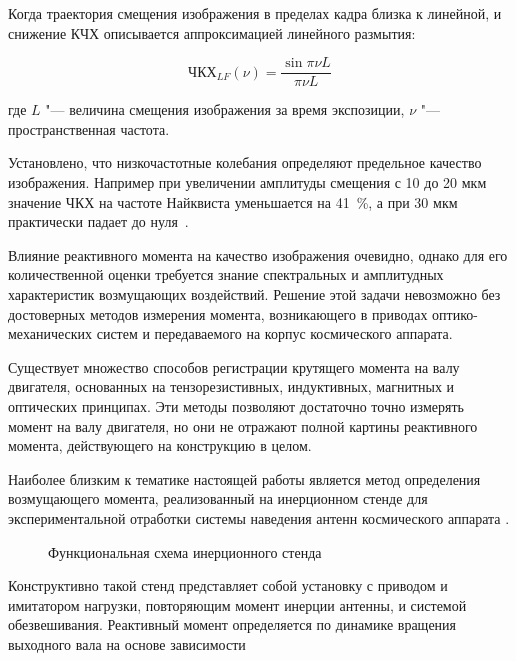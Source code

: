 Когда траектория смещения изображения в пределах кадра близка к линейной, и снижение КЧХ описывается аппроксимацией
линейного размытия:

\begin{equation}
	\label{mtf_lf}
	\text{ЧКХ}_{LF}(\nu)=\frac{\sin{\pi \nu L}}{\pi \nu L}
\end{equation}

где \(L\) "--- величина смещения изображения за время экспозиции, \(\nu\) "--- пространственная частота.

Установлено, что низкочастотные колебания определяют предельное качество изображения. Например при увеличении амплитуды смещения с 10 до 20 мкм значение ЧКХ на частоте Найквиста уменьшается на 41~\%, а при 30 мкм практически падает до нуля~\cite{wahballah2018smear}.

Влияние реактивного момента на качество изображения очевидно, однако для его количественной оценки требуется знание спектральных и амплитудных характеристик возмущающих воздействий. Решение этой задачи невозможно без достоверных методов измерения момента, возникающего в приводах оптико-механических систем и передаваемого на корпус космического аппарата.

Существует множество способов регистрации крутящего момента на валу двигателя, основанных на тензорезистивных, индуктивных, магнитных и оптических принципах. Эти методы позволяют достаточно точно измерять момент на валу двигателя, но они не отражают полной картины реактивного момента, действующего на конструкцию в целом.

Наиболее близким к тематике настоящей работы является метод определения возмущающего момента, реализованный на инерционном стенде для экспериментальной отработки системы наведения антенн космического аппарата \cite{Goncharuk2013}. 

\begin{figure}[h!] 
	\caption{Функциональная схема инерционного стенда}
	\label{fig:stand} 
\end{figure}

Конструктивно такой стенд представляет собой установку с приводом и имитатором нагрузки, повторяющим момент инерции антенны, и системой обезвешивания. Реактивный момент определяется по динамике вращения выходного вала на основе зависимости

